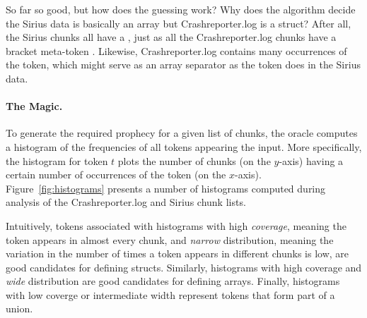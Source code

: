 So far so good, but how does the guessing work?  Why does the
algorithm decide the Sirius data is basically an array but 
Crashreporter.log is a struct? After all, the Sirius chunks all have
a , just as all the Crashreporter.log chunks have a bracket
meta-token \cd{[*]}. Likewise, Crashreporter.log contains many occurrences of
the  token, which might serve as
an array separator as the  token does in the Sirius data.



\paragraph*{The Magic.}
To generate the required prophecy for a given list of chunks, the
oracle computes a histogram of the frequencies of all tokens appearing
the input.  
More specifically, the histogram for token $t$
plots the number of chunks (on the $y$-axis)
having a certain number of occurrences of the token (on the $x$-axis). 
Figure~\ref{fig:histograms} presents a number of histograms computed
during analysis of the Crashreporter.log and Sirius chunk lists.

Intuitively, tokens associated 
with histograms with high {\em coverage}, meaning the token appears
in almost every chunk, and {\em narrow} distribution, meaning the variation in
the number of times a token appears in different chunks is low, are
good candidates for defining structs.  Similarly, histograms with
high coverage and {\em wide} distribution are good candidates for defining
arrays.  Finally, histograms with low coverge or intermediate width
represent tokens that form part of a union.  


